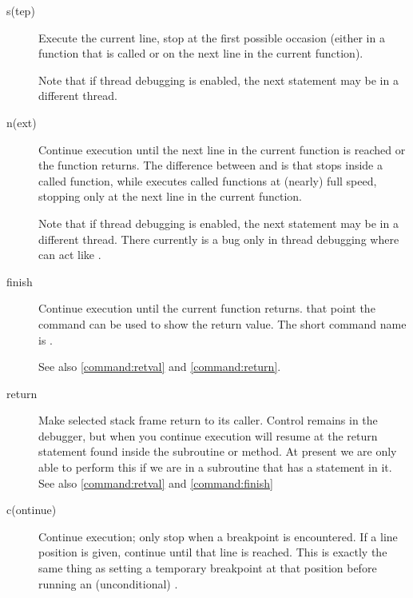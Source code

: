 \begin{description}

\item[s(tep) ]\label{command:step}

Execute the current line, stop at the first possible occasion
(either in a function that is called or on the next line in the
current function).

Note that if thread debugging is enabled, the next statement may be in a
different thread.

\item[n(ext) ]\label{command:next}

Continue execution until the next line in the current function
is reached or the function returns.  The difference between  and
 is that  stops inside a called function, while
 executes called functions at (nearly) full speed, 
stopping only at the next line in the current function.

Note that if thread debugging is enabled, the next statement may be in
a different thread. There currently is a bug only in thread debugging
where  can act like .

\item[finish]\label{command:finish}

Continue execution until the current function returns.
that point the  command can be used to show the
return value. The short command name is .

See also \ref{command:retval} and \ref{command:return}.

\item[return]\label{command:return}

Make selected stack frame return to its caller. Control remains in the
debugger, but when you continue execution will resume at the return
statement found inside the subroutine or method.  At present we are
only able to perform this if we are in a subroutine that has a
 statement in it.  See also \ref{command:retval} and
\ref{command:finish}

\item[c(ontinue) ]

Continue execution; only stop when a breakpoint is encountered. If a
line position is given, continue until that line is reached. This is
exactly the same thing as setting a temporary breakpoint at that
position before running an (unconditional) .


\end{description}
